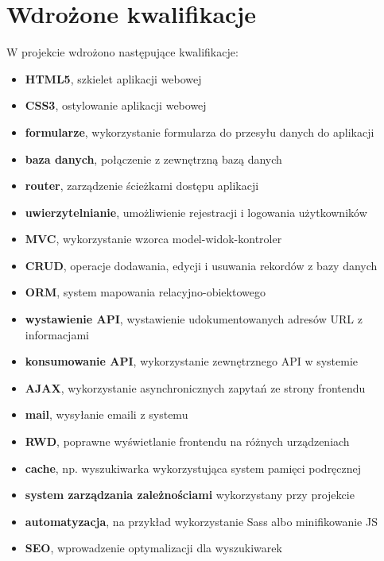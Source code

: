 \documentclass[12pt,a4paper]{article}
\begin{document}
	\section{Wdrożone kwalifikacje}	
		\indent W projekcie wdrożono następujące kwalifikacje:
		\begin{itemize}
			\item \textbf{HTML5}, szkielet aplikacji webowej
			\item \textbf{CSS3}, ostylowanie aplikacji webowej
			\item \textbf{formularze}, wykorzystanie formularza do przesyłu danych do aplikacji
			\item \textbf{baza danych}, połączenie z zewnętrzną bazą danych
			\item \textbf{router}, zarządzenie ścieżkami dostępu aplikacji
			\item \textbf{uwierzytelnianie}, umożliwienie rejestracji i logowania użytkowników
			\item \textbf{MVC}, wykorzystanie wzorca model-widok-kontroler
			\item \textbf{CRUD}, operacje dodawania, edycji i usuwania rekordów z bazy danych
			\item \textbf{ORM}, system mapowania relacyjno-obiektowego 
			\item \textbf{wystawienie API}, wystawienie udokumentowanych adresów URL z informacjami
			\item \textbf{konsumowanie API}, wykorzystanie zewnętrznego API w systemie 
			\item \textbf{AJAX}, wykorzystanie asynchronicznych zapytań ze strony frontendu
			\item \textbf{mail}, wysyłanie emaili z systemu 
			\item \textbf{RWD}, poprawne wyświetlanie frontendu na różnych urządzeniach 
			\item \textbf{cache}, np. wyszukiwarka wykorzystująca system pamięci podręcznej
			\item \textbf{system zarządzania zależnościami} wykorzystany przy projekcie
			\item \textbf{automatyzacja}, na przykład wykorzystanie Sass albo minifikowanie JS 
			\item \textbf{SEO}, wprowadzenie optymalizacji dla wyszukiwarek
		\end{itemize}
		
\end{document}
